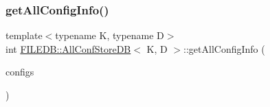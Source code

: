 \subsubsection{\texorpdfstring{getAllConfigInfo()}{getAllConfigInfo()}\hspace{0.1cm}{\footnotesize\ttfamily [3/3]}}
{\footnotesize\ttfamily template$<$typename K, typename D$>$ \\
int \mbox{\hyperlink{classFILEDB_1_1AllConfStoreDB}{F\+I\+L\+E\+D\+B\+::\+All\+Conf\+Store\+DB}}$<$ K, D $>$\+::get\+All\+Config\+Info (\begin{DoxyParamCaption}\item[{std\+::vector$<$ \mbox{\hyperlink{classFILEDB_1_1ConfigInfo}{Config\+Info}} $>$ \&}]{configs }\end{DoxyParamCaption})\hspace{0.3cm}{\ttfamily [inline]}}


